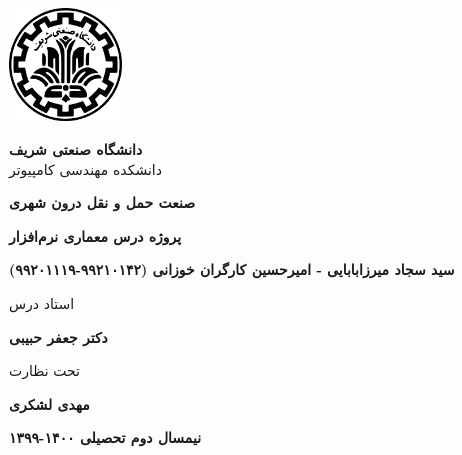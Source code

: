 \thispagestyle{empty}
\begin{center}
\includegraphics[height=3cm]{sut_logo.png}
\vspace{0.4cm}

{\large
	\textbf{دانشگاه صنعتی شریف}\\
	دانشکده مهندسی کامپیوتر
}
\vspace{3.5cm}

{\LARGE
	\textbf{صنعت حمل و نقل درون شهری}\\
}
\vspace{3.5cm}

{\large
	\textbf{پروژه درس معماری نرم‌افزار}\\
}
\vspace{1cm}

{\Large
	\textbf{سید سجاد میرزابابایی - امیرحسین کارگران خوزانی (٩٩٢١٠١۴٢-۹۹۲۰۱۱۱۹)}\\
}
\vspace{2.5cm}

{\large
	استاد درس\\
}
\vspace{0.5cm}

{\Large
	\textbf{دکتر جعفر حبیبی}\\
}
\vspace{0.5cm}

{\large
	تحت نظارت\\
}
\vspace{0.5cm}

{\Large
	\textbf{مهدی لشکری}\\
}
\vspace{2cm}


{\Large
	\textbf{نیمسال دوم تحصیلی ۱۴۰۰-۱۳۹۹}
}

\end{center}
\restoregeometry
\pagebreak

%
%
%	
%

